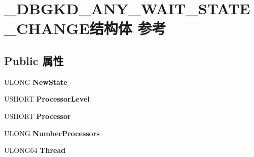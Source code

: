 \hypertarget{struct___d_b_g_k_d___a_n_y___w_a_i_t___s_t_a_t_e___c_h_a_n_g_e}{}\section{\+\_\+\+D\+B\+G\+K\+D\+\_\+\+A\+N\+Y\+\_\+\+W\+A\+I\+T\+\_\+\+S\+T\+A\+T\+E\+\_\+\+C\+H\+A\+N\+G\+E结构体 参考}
\label{struct___d_b_g_k_d___a_n_y___w_a_i_t___s_t_a_t_e___c_h_a_n_g_e}
\subsection*{Public 属性}
\begin{DoxyCompactItemize}
\item 
\mbox{\label{struct___d_b_g_k_d___a_n_y___w_a_i_t___s_t_a_t_e___c_h_a_n_g_e_aa114fbca47abbb1e1760c1c6aa8b715d}} 
U\+L\+O\+NG {\bfseries New\+State}
\item 
\mbox{\label{struct___d_b_g_k_d___a_n_y___w_a_i_t___s_t_a_t_e___c_h_a_n_g_e_ac3f32ac98ba17c0a05b85d6716ff547a}} 
U\+S\+H\+O\+RT {\bfseries Processor\+Level}
\item 
\mbox{\label{struct___d_b_g_k_d___a_n_y___w_a_i_t___s_t_a_t_e___c_h_a_n_g_e_afb41c979f7f852df210aeb286d53fa07}} 
U\+S\+H\+O\+RT {\bfseries Processor}
\item 
\mbox{\label{struct___d_b_g_k_d___a_n_y___w_a_i_t___s_t_a_t_e___c_h_a_n_g_e_a3dafcacce005c9caa2b574b14471444c}} 
U\+L\+O\+NG {\bfseries Number\+Processors}
\item 
\mbox{\label{struct___d_b_g_k_d___a_n_y___w_a_i_t___s_t_a_t_e___c_h_a_n_g_e_ac460f172e111afc0045efed783c2aae4}} 
U\+L\+O\+N\+G64 {\bfseries Thread}
\item 
\mbox{\label{struct___d_b_g_k_d___a_n_y___w_a_i_t___s_t_a_t_e___c_h_a_n_g_e_ab68f481a242a5b5093b38a7ab6328176}} 

\end{DoxyCompactItemize}
